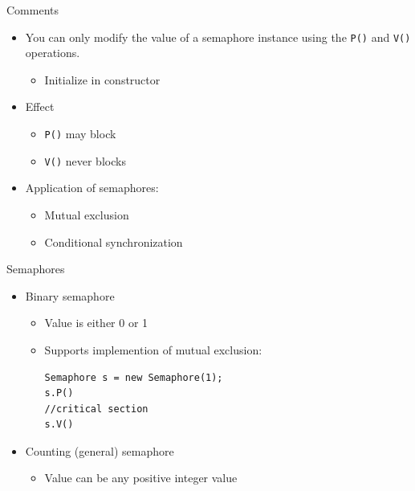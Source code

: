 \begin{frame}{Comments}
  \begin{itemize}
  \item You can only modify the value of a semaphore instance using
    the \lstinline!P()! and \lstinline!V()! operations.
    \begin{itemize}
    \item Initialize in constructor
    \end{itemize}
  \item Effect
    \begin{itemize}
    \item \lstinline!P()! may block 
    \item \lstinline!V()! never blocks
    \end{itemize}
  \item Application of semaphores:
    \begin{itemize}
    \item Mutual exclusion
    \item Conditional synchronization
    \end{itemize}
  \end{itemize}
\end{frame}

\begin{frame}[fragile]{Semaphores}
  \begin{itemize}
  \item Binary  semaphore
    \begin{itemize}
    \item Value is either 0 or 1
    \item Supports implemention of  mutual exclusion:
\begin{lstlisting}
Semaphore s = new Semaphore(1);
s.P()
//critical section
s.V()
\end{lstlisting}
    \end{itemize}
  \item Counting (general) semaphore
    \begin{itemize}
    \item Value can be any positive integer value
    \end{itemize}
  \end{itemize}
\end{frame}

